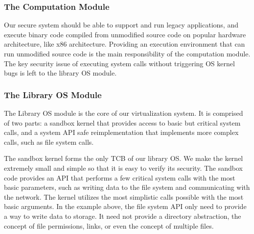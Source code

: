 {\subsubsection{The Computation Module}

Our secure system should be able to support and run legacy applications,
and execute binary code compiled from unmodified source code on popular hardware architecture,
like x86 architecture. Providing an execution environment that can run unmodified source code is
the main responsibility of the computation module. The key security issue of executing system calls
without triggering OS kernel bugs is left to the library OS module.

\subsubsection{The Library OS Module}

The Library OS module is the core of our virtualization system. It is comprised
of two parts: a sandbox kernel that provides access to basic but critical
system calls, and a system API safe reimplementation that implements more
complex calls, such as file system calls.

The sandbox kernel forms the only TCB of our library OS.
We make the kernel extremely small and simple so that it is easy to verify its security.
The sandbox code provides an API that performs
a few critical system calls with the most basic parameters, such as
writing data to the file system
and communicating with the network.  The kernel utilizes the most simplistic calls
possible with the most
basic arguments. In the example above, the file system API only need to provide a way
to write data to storage.  It need not provide a directory abstraction, the
concept of file permissions, links, or even the concept of multiple files.


}
